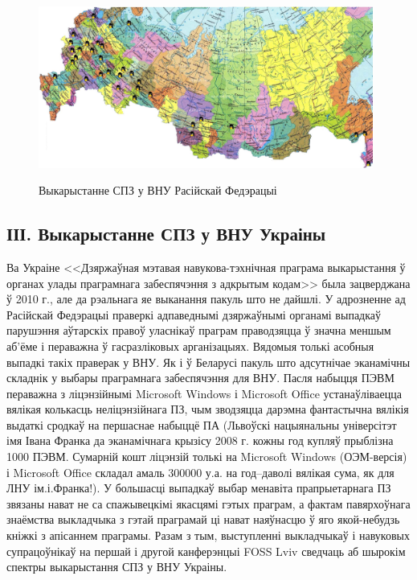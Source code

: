 \documentclass[10pt, a5paper]{article}
\begin{document}
\begin{figure}[htpb]
  \centering
  \includegraphics[width=11cm]{03_2012_russia2_with_tux}
  \label{fig:Zlobin2}
  \caption{Выкарыстанне СПЗ у ВНУ Расійскай Федэрацыі}
\end{figure}

\subsection*{ІІІ. Выкарыстанне СПЗ у ВНУ Украіны}

Ва Украіне <<Дзяржаўная мэтавая навукова-тэхнічная праграма выкарыстання ў органах улады праграмнага забеспячэння з адкрытым кодам>> была зацверджана ў 2010 г., але да рэальнага яе выканання пакуль што не дайшлі. У адрозненне ад Расійскай Федэрацыі праверкі адпаведнымі дзяржаўнымі органамі выпадкаў парушэння аўтарскіх правоў уласнікаў праграм праводзяцца ў значна меншым аб'ёме і пераважна ў гасразліковых арганізацыях. Вядомыя толькі асобныя выпадкі такіх праверак у ВНУ. Як і ў Беларусі пакуль што адсутнічае эканамічны складнік у выбары праграмнага забеспячэння для ВНУ. Пасля набыцця ПЭВМ пераважна з ліцэнзійнымі Microsoft Windows і Microsoft Office устанаўліваецца вялікая колькасць неліцэнзійнага ПЗ, чым зводзяцца дарэмна фантастычна вялікія выдаткі сродкаў на першаснае набыццё ПА (Львоўскі нацыянальны універсітэт імя Івана Франка да эканамічнага крызісу 2008 г. кожны год купляў прыблізна 1000 ПЭВМ. Сумарній кошт ліцэнзій толькі на Microsoft Windows (ОЭМ-версія) і Microsoft Office складал амаль 300000 у.а. на год--даволі вялікая сума, як для ЛНУ ім.і.Франка!). У большасці выпадкаў выбар менавіта прапрыетарнага ПЗ звязаны нават не са спажывецкімі якасцямі гэтых праграм, а фактам павярхоўнага знаёмства выкладчыка з гэтай праграмай ці нават наяўнасцю ў яго якой-небудзь кніжкі з апісаннем праграмы. Разам з тым, выступленні выкладчыкаў і навуковых супрацоўнікаў на першай і другой канферэнцыі FOSS Lviv  \cite{Zlobin1, Zlobin2} сведчаць аб шырокім спектры выкарыстання СПЗ у ВНУ Украіны.
\end{document}
